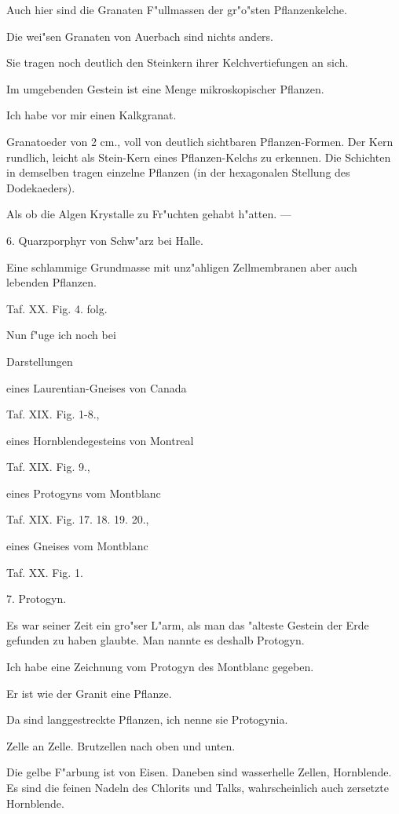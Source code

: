 \documentclass[a4paper, 11pt, oneside, german]{article}
\begin{document}
Auch hier sind die Granaten F"ullmassen der gr"o"sten Pflanzenkelche.

Die wei"sen Granaten von Auerbach sind nichts anders.

Sie tragen noch deutlich den Steinkern ihrer Kelchvertiefungen an sich.

Im umgebenden Gestein ist eine Menge mikroskopischer Pflanzen.

Ich habe vor mir einen Kalkgranat.

Granatoeder von 2 cm., voll von deutlich sichtbaren Pflanzen-Formen. Der Kern rundlich, leicht als Stein-Kern eines Pflanzen-Kelchs zu erkennen. Die Schichten in demselben tragen einzelne Pflanzen (in der hexagonalen Stellung des Dodekaeders).

Als ob die Algen Krystalle zu Fr"uchten gehabt h"atten. ---

6. Quarzporphyr von Schw"arz bei Halle.

Eine schlammige Grundmasse mit unz"ahligen Zellmembranen aber auch lebenden Pflanzen.

Taf. XX. Fig. 4. folg.

Nun f"uge ich noch bei

Darstellungen

eines Laurentian-Gneises von Canada

Taf. XIX. Fig. 1-8.,

eines Hornblendegesteins von Montreal

Taf. XIX. Fig. 9.,

eines Protogyns vom Montblanc

Taf. XIX. Fig. 17. 18. 19. 20.,

eines Gneises vom Montblanc

Taf. XX. Fig. 1.

7. Protogyn.

Es war seiner Zeit ein gro"ser L"arm, als man das "alteste Gestein der Erde gefunden zu haben glaubte. Man nannte es deshalb Protogyn.

Ich habe eine Zeichnung vom Protogyn des Montblanc gegeben.

Er ist wie der Granit eine Pflanze.

Da sind langgestreckte Pflanzen, ich nenne sie Protogynia.

Zelle an Zelle. Brutzellen nach oben und unten.

Die gelbe F"arbung ist von Eisen. Daneben sind wasserhelle Zellen, Hornblende. Es sind die feinen Nadeln des Chlorits und Talks, wahrscheinlich auch zersetzte Hornblende.
\end{document}
